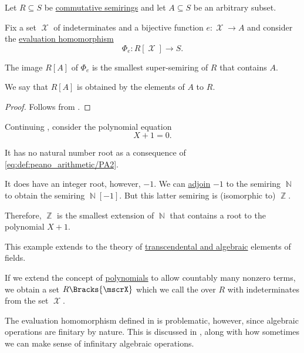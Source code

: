 \begin{proposition}\label{thm:adjoining_elements_to_semiring}
  Let \( R \subseteq S \) be \hyperref[def:semiring/commutative]{commutative semirings} and let \( A \subseteq S \) be an arbitrary subset.

  Fix a set \( \mscrX \) of indeterminates and a bijective function \( e: \mscrX \to A \) and consider the \hyperref[thm:polynomial_semiring_universal_property]{evaluation homomorphism}
  \begin{equation*}
    \Phi_e: R[\mscrX] \to S.
  \end{equation*}

  The image \( R[A] \) of \( \Phi_e \) is the smallest super-semiring of \( R \) that contains \( A \).

  We say that \( R[A] \) is obtained by  the elements of \( A \) to \( R \).
\end{proposition}
\begin{proof}
  Follows from .
\end{proof}

\begin{example}\label{ex:adjoining_root}
  Continuing , consider the polynomial equation
  \begin{equation*}
    X + 1 = 0.
  \end{equation*}

  It has no natural number root as a consequence of \eqref{eq:def:peano_arithmetic/PA2}.

  It does have an integer root, however, \( -1 \). We can \hyperref[thm:adjoining_elements_to_semiring]{adjoin} \( -1 \) to the semiring \( \BbbN \) to obtain the semiring \( \BbbN[-1] \). But this latter semiring is (isomorphic to) \( \BbbZ \).

  Therefore, \( \BbbZ \) is the smallest extension of \( \BbbN \) that contains a root to the polynomial \( X + 1 \).

  This example extends to the theory of \hyperref[def:transcendetal_element]{transcendental and algebraic} elements of fields.
\end{example}

\begin{definition}\label{def:formal_power_series}\mimprovised
  If we extend the concept of \hyperref[def:polynomial_semiring]{polynomials} to allow countably many nonzero terms, we obtain a set \( R\Bracks{\mscrX} \) which we call the  over \( R \) with indeterminates from the set \( \mscrX \).

  The evaluation homomorphism defined in  is problematic, however, since algebraic operations are finitary by nature. This is discussed in , along with how sometimes we can make sense of infinitary algebraic operations.
\end{definition}
